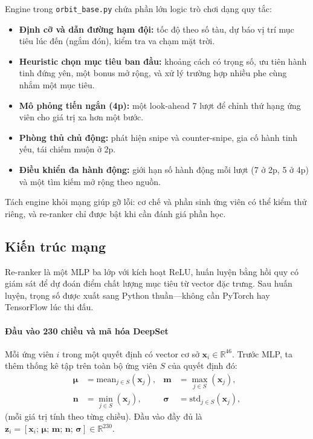 \documentclass[conference]{IEEEtran}
\begin{document}
Engine trong \texttt{orbit\_base.py} chứa phần lớn logic trò chơi dạng quy tắc:
\begin{itemize}
\item \textbf{Định cỡ và dẫn đường hạm đội:} tốc độ theo số tàu, dự báo vị trí mục tiêu lúc đến (ngắm đón), kiểm tra va chạm mặt trời.
\item \textbf{Heuristic chọn mục tiêu ban đầu:} khoảng cách có trọng số, ưu tiên hành tinh đứng yên, một bonus mở rộng, và xử lý trường hợp nhiều phe cùng nhắm một mục tiêu.
\item \textbf{Mô phỏng tiến ngắn (4p):} một look-ahead 7 lượt để chỉnh thứ hạng ứng viên cho giá trị xa hơn một bước.
\item \textbf{Phòng thủ chủ động:} phát hiện snipe và counter-snipe, gia cố hành tinh yếu, tái chiếm muộn ở 2p.
\item \textbf{Điều khiển đa hành động:} giới hạn số hành động mỗi lượt (7 ở 2p, 5 ở 4p) và một tìm kiếm mở rộng theo nguồn.
\end{itemize}
Tách engine khỏi mạng giúp gỡ lỗi: cơ chế và phần sinh ứng viên có thể kiểm thử riêng, và re-ranker chỉ được bật khi cần đánh giá phần học.

\subsection{Kiến trúc mạng}
\label{sec:network}

Re-ranker là một MLP ba lớp với kích hoạt ReLU, huấn luyện bằng hồi quy có giám sát để dự đoán điểm chất lượng mục tiêu từ vector đặc trưng. Sau huấn luyện, trọng số được xuất sang Python thuần---không cần PyTorch hay TensorFlow lúc thi đấu.

\paragraph{Đầu vào 230 chiều và mã hóa DeepSet}
Mỗi ứng viên $i$ trong một quyết định có vector cơ sở $\mathbf{x}_i \in \mathbb{R}^{46}$. Trước MLP, ta thêm thống kê tập trên toàn bộ ứng viên $S$ của quyết định đó:
\begin{align}
\boldsymbol{\mu} &= \mathrm{mean}_{j \in S}(\mathbf{x}_j), &
\mathbf{m} &= \max_{j \in S}(\mathbf{x}_j), \\
\mathbf{n} &= \min_{j \in S}(\mathbf{x}_j), &
\boldsymbol{\sigma} &= \mathrm{std}_{j \in S}(\mathbf{x}_j),
\end{align}
(mỗi giá trị tính theo từng chiều). Đầu vào đầy đủ là $\mathbf{z}_i = [\mathbf{x}_i;\, \boldsymbol{\mu};\, \mathbf{m};\, \mathbf{n};\, \boldsymbol{\sigma}] \in \mathbb{R}^{230}$.
\end{document}
